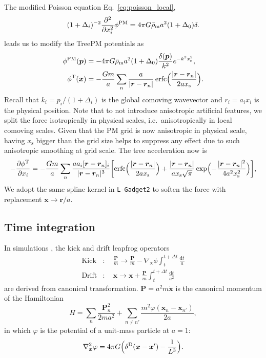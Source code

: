 \documentclass[a4paper,11pt]{article}
\DeclareMathOperator{\deltaD}{\delta^\mathrm{D}}
\DeclareMathOperator{\erfc}{erfc}
\renewcommand{\d}{\mathrm{d}}
\newcommand{\vr}{{\bm r}}
\newcommand{\vx}{{\bm x}}
\newcommand{\vp}{{\bm p}}
\newcommand{\vP}{{\bm P}}
\newcommand{\rhobarm}{{\bar\rho_\mathrm{m}}}
\newcommand{\Tree}{\mathrm{T}}
\newcommand{\PM}{\mathrm{PM}}
\newcommand{\xs}{x_\mathrm{s}}
\begin{document}
The modified Poisson equation Eq.~\eqref{eq:poisson_local},
\begin{equation}
    (1+\Delta_i)^{-2} \frac{\partial^2}{\partial x_i^2} \phi^{\rm PM}
    = 4\pi G \rhobarm a^2 (1 + \Delta_0) \delta.
\end{equation}
leads us to modify the TreePM potentials as
\begin{align}
    \phi^\PM(\vp) &= - 4\pi G \rhobarm a^2 (1 + \Delta_0)
        \frac{\delta(\vp)}{k^2} e^{- k^2 \xs^2}, \\
    \phi^\Tree(\vx) &= - \frac{G m}a \sum_n \frac{a}{|\vr - \vr_n|}
    \erfc \Bigl( \frac{|\vr - \vr_n|}{2 a \xs} \Bigr).
\end{align}
Recall that $k_i = p_i / (1 + \Delta_i)$ is the global comoving wavevector
and $r_i = a_i x_i$ is the physical position.
Note that to not introduce anisotropic artificial features, we split the force
isotropically in physical scales, i.e.\ anisotropically in local comoving
scales.
Given that the PM grid is now anisotropic in physical scale, having $\xs$
bigger than the grid size helps to suppress any effect due to such anisotropic
smoothing at grid scale.
The tree acceleration now is
\begin{equation}
    - \frac{\partial\phi^\Tree}{\partial x_i} = - \frac{G m}a \sum_n
    \frac{a a_i [\vr - \vr_n]_i}{|\vr - \vr_n|^3}
    \biggl[ \erfc \Bigl( \frac{|\vr - \vr_n|}{2 a \xs} \Bigr)
            + \frac{|\vr - \vr_n|}{a \xs \sqrt\pi}
            \exp \Bigl( - \frac{|\vr - \vr_n|^2}{4 a^2 \xs^2} \Bigr) \biggr],
\end{equation}
We adopt the same spline kernel in \texttt{L-Gadget2} to soften the force
with replacement $\vx \to \vr / a$.







\subsection{Time integration}
\label{sub:integ}

In simulations \cite{QuinnKatzEtAl97, Springel05}, the kick and drift leapfrog
operators
\begin{align}
    \mathrm{Kick} &: \quad \frac{\vP}m \to \frac{\vP}m
        - \nabla_\vx \phi \int_t^{t+\Delta t} \frac{\d t}a  \\
    \mathrm{Drift} &: \quad \vx \to \vx
        + \frac{\vP}{m} \int_t^{t+\Delta t} \frac{\d t}{a^2}
\end{align}
are derived from canonical transformation.
$\vP = a^2 m \dot \vx$ is the canonical momentum of the Hamiltonian
\begin{equation}
    H = \sum_n \frac{\vP_n^2}{2 m a^2}
    + \sum_{n \neq n'} \frac{m^2 \varphi(\vx_n - \vx_{n'})}{2a},
\end{equation}
in which $\varphi$ is the potential of a unit-mass particle at $a=1$:
\begin{equation}
    \nabla_\vx^2 \varphi = 4\pi G \Bigl(\deltaD(\vx-\vx') - \frac1{L^3} \Bigr).
\end{equation}
\end{document}
